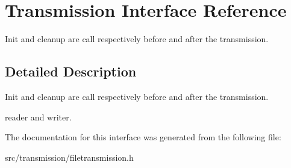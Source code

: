 \hypertarget{interfaceTransmission}{}\section{Transmission Interface Reference}
\label{interfaceTransmission}


Init and cleanup are call respectively before and after the transmission.  




\subsection{Detailed Description}
Init and cleanup are call respectively before and after the transmission. 

reader and writer. 

The documentation for this interface was generated from the following file\+:\begin{DoxyCompactItemize}
\item 
src/transmission/filetransmission.\+h\end{DoxyCompactItemize}

